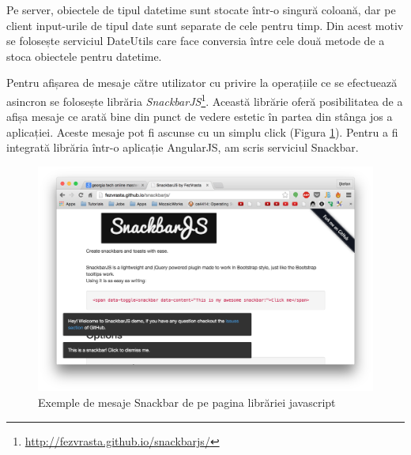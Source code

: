 



Pe server, obiectele de tipul datetime sunt stocate 
într-o singură coloană, dar pe client input-urile
de tipul date sunt separate de cele pentru timp.
Din acest motiv se folosește serviciul DateUtils
care face conversia între cele două metode
de a stoca obiectele pentru datetime.



Pentru afișarea de mesaje către utilizator cu privire la
operațiile ce se efectuează asincron se folosește
librăria \emph{SnackbarJS}\footnote{\url{http://fezvrasta.github.io/snackbarjs/}}.
Această librărie oferă posibilitatea de a afișa mesaje
ce arată bine din punct de vedere estetic
în partea din stânga jos a aplicației. Aceste mesaje
pot fi ascunse cu un simplu click (Figura \ref{fig:snackbar}). Pentru a fi integrată
librăria într-o aplicație AngularJS, am scris serviciul
Snackbar.

\begin{figure}[b]
  \includegraphics[width=1\textwidth]{./chap6-files/snackbar}
  \caption{Exemple de mesaje Snackbar de pe pagina librăriei javascript}
  \label{fig:snackbar}
\end{figure}



